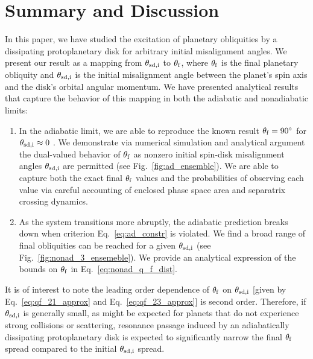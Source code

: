 \documentclass[
        fleqn,
        usenatbib,
    ]{mnras}
\begin{document}
\section{Summary and Discussion}\label{s:disc}

In this paper, we have studied the excitation of planetary obliquities by a
dissipating protoplanetary disk for arbitrary initial misalignment angles. We
present our result as a mapping from $\theta_{\rm sd, i}$ to $\theta_{\rm f}$,
where $\theta_{\rm f}$ is the final planetary obliquity and $\theta_{\rm sd, i}$
is the initial misalignment angle between the planet's spin axis and the disk's
orbital angular momentum. We have presented analytical results that capture the
behavior of this mapping in both the adiabatic and nonadiabatic limits:
\begin{enumerate}
    \item In the adiabatic limit, we are able to reproduce the known result
        $\theta_{\rm f} = 90^\circ$ for $\theta_{\rm sd, i} \approx 0$
        \citep{millholland_disk}. We demonstrate via numerical simulation and
        analytical argument the dual-valued behavior of $\theta_{\rm f}$ as
        nonzero initial spin-disk misalignment angles $\theta_{\rm sd, i}$ are
        permitted (see Fig.~\ref{fig:ad_ensemble}). We are able to capture both
        the exact final $\theta_{\rm f}$ values and the probabilities of
        observing each value via careful accounting of enclosed phase space area
        and separatrix crossing dynamics.

    \item As the system transitions more abruptly, the adiabatic prediction
        breaks down when criterion Eq.~\eqref{eq:ad_constr} is violated. We find
        a broad range of final obliquities can be reached for a given
        $\theta_{\rm sd, i}$ (see Fig.~\ref{fig:nonad_3_ensemeble}). We provide
        an analytical expression of the bounds on $\theta_{\rm f}$ in
        Eq.~\eqref{eq:nonad_q_f_dist}.
\end{enumerate}

It is of interest to note the leading order dependence of $\theta_{\rm f}$ on
$\theta_{\rm sd, i}$ [given by Eq.~\eqref{eq:qf_21_approx} and
Eq.~\eqref{eq:qf_23_approx}] is second order. Therefore, if $\theta_{\rm sd, i}$
is generally small, as might be expected for planets that do not experience
strong collisions or scattering, resonance passage induced by an adiabatically
dissipating protoplanetary disk is expected to significantly narrow the final
$\theta_{\rm f}$ spread compared to the initial $\theta_{\rm sd, i}$ spread.
\end{document}
